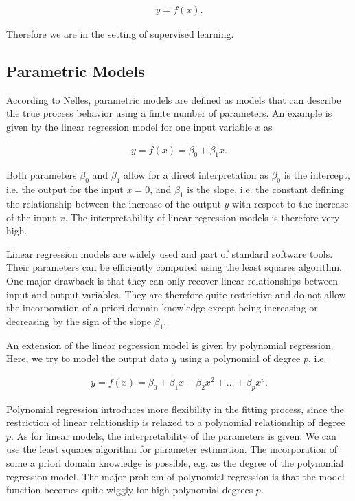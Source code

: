 \begin{align} \label{eq:basic-model-structure}
	y = f(x).
\end{align}

Therefore we are in the setting of supervised learning. 

\subsection{Parametric Models}

According to Nelles, parametric models are defined as models that can describe the true process behavior using a finite number of parameters\cite{nelles2013nonlinear}. An example is given by the linear regression model for one input variable $x$ as

\begin{align} \label{eq:classical-linear-model}
	y= f(x) = \beta_0 + \beta_1 x.
\end{align}

Both parameters $\beta_0$ and $\beta_1$ allow for a direct interpretation as $\beta_0$ is the intercept, i.e. the output for the input $x=0$, and $\beta_1$ is the slope, i.e. the constant defining the relationship between the increase of the output $y$ with respect to the increase of the input $x$.  The interpretability of linear regression models is therefore very high. 

Linear regression models are widely used and part of standard software tools. Their parameters can be efficiently computed using the least squares algorithm. One major drawback is that they can only recover linear relationships between input and output variables. They are therefore quite restrictive and do not allow the incorporation of a priori domain knowledge except being increasing or decreasing by the sign of the slope $\beta_1$. 

An extension of the linear regression model is given by polynomial regression. Here, we try to model the output data $y$ using a polynomial of degree $p$, i.e.

\begin{align} \label{eq:polynomial-model}
	y = f(x) = \beta_0 + \beta_1 x + \beta_2 x^2 + \dots + \beta_p x^p.
\end{align}

Polynomial regression introduces more flexibility in the fitting process, since the restriction of linear relationship is relaxed to a polynomial relationship of degree $p$. As for linear models, the interpretability of the parameters is given. We can use the least squares algorithm for parameter estimation. The incorporation of some a priori domain knowledge is possible, e.g. as the degree of the polynomial regression model. The major problem of polynomial regression is that the model function becomes quite wiggly for high polynomial degrees $p$. 

